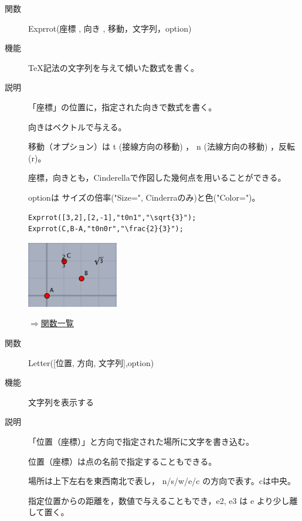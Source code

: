 \documentclass[papersize,a4paper,10pt,uplatex]{jsarticle}
\begin{document}
\begin{description}
\vspace{\baselineskip}
\hypertarget{exprrot}{}
\item[関数]Exprrot(座標 , 向き , 移動，文字列，option)
\item[機能]\TeX 記法の文字列を与えて傾いた数式を書く。
\item[説明]「座標」の位置に，指定された向きで数式を書く。

向きはベクトルで与える。

移動（オプション）は t (接線方向の移動) ， n (法線方向の移動) ，反転 (r)。

座標，向きとも，Cinderellaで作図した幾何点を用いることができる。

optionは サイズの倍率("Size=", Cinderraのみ)と色("Color=")。

\begin{verbatim}
Exprrot([3,2],[2,-1],"t0n1","\sqrt{3}");
Exprrot(C,B-A,"t0n0r","\frac{2}{3}");
\end{verbatim}

\vspace{\baselineskip}
\hspace{10mm}\includegraphics[bb=0.00 0.00 181.01 131.01,width=4cm]{Fig/exprrot.pdf} \hspace{10mm} 

\begin{flushright}\hyperlink{functionlist}{$\Rightarrow$関数一覧}\end{flushright}

\vspace{\baselineskip}
\hypertarget{letter}{}\item[関数]Letter([位置, 方向, 文字列],option)
\item[機能]文字列を表示する
\item[説明]「位置（座標）」と方向で指定された場所に文字を書き込む。

位置（座標）は点の名前で指定することもできる。

場所は上下左右を東西南北で表し， n/s/w/e/c の方向で表す。cは中央。

指定位置からの距離を，数値で与えることもでき，e2, e3 は e より少し離して置く。


\end{description}
\end{document}
